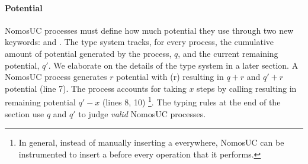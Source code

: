 \paragraph{Potential}
NomosUC processes must define how much potential they use through two new keywords: \inline{$\ngenpot$} and \inline{$\ntick$}.
The type system tracks, for every process, the cumulative amount of potential generated by the process, $q$, and the current remaining potential, $q'$. We elaborate on the details of the type system in a later section.
A NomosUC process generates $r$ potential with \inline{$\ngenpot$}(r) resulting in $q+r$ and $q'+r$ potential (line 7).
The process accounts for taking $x$ steps by calling  resulting in remaining potential $q'-x$ (lines 8, 10)
\footnote{In general, instead of manually inserting a \itick everywhere, NomosUC can be instrumented to insert a \itick before every operation that it performs.}.
The typing rules at the end of the section use $q$ and $q'$ to judge \emph{valid} NomosUC processes.

